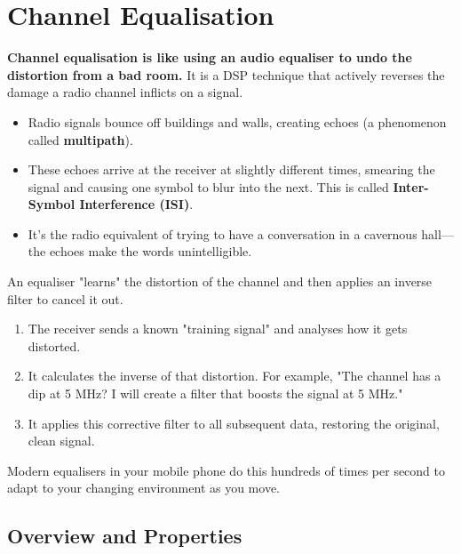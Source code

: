 
\chapter{Channel Equalisation}
\label{ch:equalisation}

\begin{nontechnical}
    \textbf{Channel equalisation is like using an audio equaliser to undo the distortion from a bad room.} It is a DSP technique that actively reverses the damage a radio channel inflicts on a signal.

    \begin{itemize}
        \item Radio signals bounce off buildings and walls, creating echoes (a phenomenon called \textbf{multipath}).
        \item These echoes arrive at the receiver at slightly different times, smearing the signal and causing one symbol to blur into the next. This is called \textbf{Inter-Symbol Interference (ISI)}.
        \item It's the radio equivalent of trying to have a conversation in a cavernous hall---the echoes make the words unintelligible.
    \end{itemize}

    An equaliser "learns" the distortion of the channel and then applies an inverse filter to cancel it out.
    \begin{enumerate}[label=\arabic*.]
        \item The receiver sends a known "training signal" and analyses how it gets distorted.
        \item It calculates the inverse of that distortion. For example, "The channel has a dip at 5 MHz? I will create a filter that boosts the signal at 5 MHz."
        \item It applies this corrective filter to all subsequent data, restoring the original, clean signal.
    \end{enumerate}
    Modern equalisers in your mobile phone do this hundreds of times per second to adapt to your changing environment as you move.
\end{nontechnical}


\section{Overview and Properties}

